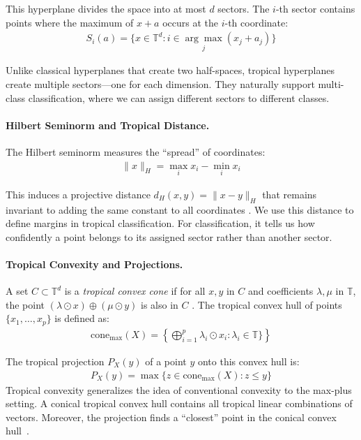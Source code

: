 \documentclass{article}
\newcommand{\trop}{\mathbb{T}}
\begin{document}
This hyperplane divides the space into at most $d$ sectors. The $i$-th sector contains points where the maximum of $x + a$ occurs at the $i$-th coordinate:
\begin{align}
S_i(a) = \{x \in \trop^d : i \in \underset{j}{\arg\max} (x_j + a_j)\}
\end{align}

Unlike classical hyperplanes that create two half-spaces, tropical hyperplanes create multiple sectors—one for each dimension. They naturally support multi-class classification, where we can assign different sectors to different classes.

\paragraph{Hilbert Seminorm and Tropical Distance.}
The Hilbert seminorm measures the ``spread'' of coordinates:
\begin{align}
\|x\|_H = \max_i x_i - \min_i x_i
\end{align}

This induces a projective distance $d_H(x,y) = \|x - y\|_H$ that remains invariant to adding the same constant to all coordinates \cite{cohen2004}. We use this distance to define margins in tropical classification. For classification, it tells us how confidently a point belongs to its assigned sector rather than another sector.

\paragraph{Tropical Convexity and Projections.}
A set $C \subset \trop^d$ is a \emph{tropical convex cone} if for all $x,y$ in $C$ and coefficients $\lambda,\mu$ in $\trop$,
the point $(\lambda \odot x) \oplus (\mu \odot y)$ is also in $C$ \cite{cohen2004,develin2004}.
The tropical convex hull of points $\{x_1,\ldots,x_p\}$ is defined as:
\begin{align}
  \text{cone}_{\max}(X) = \left\{\bigoplus_{i=1}^p \lambda_i \odot x_i : \lambda_i \in \trop\} \right\}
\end{align}

The tropical projection $P_X(y)$ of a point $y$ onto this convex hull is:
\begin{align}
P_X(y) = \max\{z \in \text{cone}_{\max}(X) : z \leq y\}
\end{align}
Tropical convexity generalizes the idea of conventional convexity to the max-plus setting. A conical tropical convex hull contains all tropical linear combinations of vectors. Moreover, the projection finds a ``closest'' point in the conical convex hull~\cite{AGNS10}.%
\end{document}

